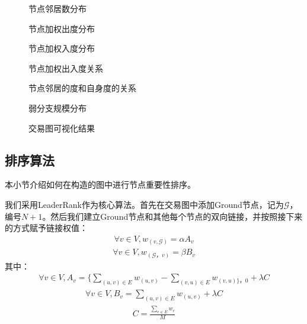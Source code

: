 \begin{figure}
	
	\caption{节点邻居数分布}\label{fig:nnd}
\end{figure}

\begin{figure}
	
	\caption{节点加权出度分布}\label{fig:nod}
\end{figure}

\begin{figure}
	
	\caption{节点加权入度分布}\label{fig:nid}
\end{figure}

\begin{figure}
	
	\caption{节点加权出入度关系}\label{fig:nio}
\end{figure}

\begin{figure}
	
	\caption{节点邻居的度和自身度的关系}\label{fig:nndd}
\end{figure}

\begin{figure}
	
	\caption{弱分支规模分布}\label{fig:ccn}
\end{figure}

\begin{figure}
	
	\caption{交易图可视化结果}\label{fig:wgc}
\end{figure}

\subsection{排序算法} \label{subsec:leaderrank}
本小节介绍如何在构造的图中进行节点重要性排序。

我们采用LeaderRank\cite{Chen2013}\cite{Li2014}作为核心算法。首先在交易图中添加Ground节点，记为$\mathcal{G}$，编号$N+1$。然后我们建立Ground节点和其他每个节点的双向链接，并按照接下来的方式赋予链接权值：
\begin{align}\label{formula:weight1}
	\forall v \in V, w_{(v, \mathcal{G})} = \alpha A_v
\end{align}
\begin{align}\label{formula:weight2}
\forall v \in V,  w_{(\mathcal{G}， v)} = \beta B_v
\end{align}
其中：
\begin{align}
	\forall v \in V, A_v = \{ \sum_{(u,v)\in E} w_{(u,v)} - \sum_{(v,u) \in E} w_{(v, u) \}， 0 } + \lambda C
\end{align}
\begin{align} \label{formula:b}
\forall v \in V,  B_v =  \sum_{(u,v) \in E} w_{(u,v)} + \lambda C
\end{align}
\begin{align}
	C = \frac{\sum_{e \in E} w_e}{M}
\end{align}

